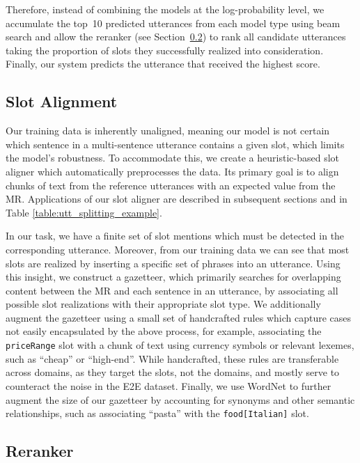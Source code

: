 \documentclass[11pt,a4paper]{article}
\begin{document}
Therefore, instead of combining the models at the log-probability level, we accumulate the top~10 predicted utterances from each model type using beam search and allow the reranker (see Section~\ref{subsec:reranker}) to rank all candidate utterances taking the proportion of slots they successfully realized into consideration. Finally, our system predicts the utterance that received the highest score.


\subsection{Slot Alignment}
\label{subsec:slot_alignment}

Our training data is inherently unaligned, meaning our model is not certain which sentence in a multi-sentence utterance contains a given slot, which limits the model's robustness. To accommodate this, we create a heuristic-based slot aligner which automatically preprocesses the data. Its primary goal is to align chunks of text from the reference utterances with an expected value from the MR. Applications of our slot aligner are described in subsequent sections and in Table \ref{table:utt_splitting_example}.

In our task, we have a finite set of slot mentions which must be detected in the corresponding utterance. Moreover, from our training data we can see that most slots are realized by inserting a specific set of phrases into an utterance. Using this insight, we construct a gazetteer, which primarily searches for overlapping content between the MR and each sentence in an utterance, by associating all possible slot realizations with their appropriate slot type. We additionally augment the gazetteer using a small set of handcrafted rules which capture cases not easily encapsulated by the above process, for example, associating the \texttt{priceRange} slot with a chunk of text using currency symbols or relevant lexemes, such as ``cheap'' or ``high-end''. While handcrafted, these rules are transferable across domains, as they target the slots, not the domains, and mostly serve to counteract the noise in the E2E dataset. Finally, we use WordNet \cite{fellbaum1998wordnet} to further augment the size of our gazetteer by accounting for synonyms and other semantic relationships, such as associating ``pasta'' with the \texttt{food[Italian]} slot.


\subsection{Reranker}
\label{subsec:reranker}
\end{document}
